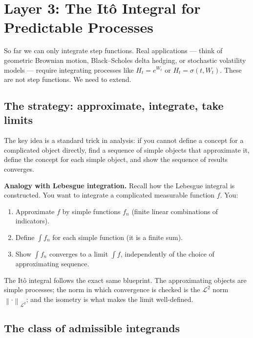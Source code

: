 \documentclass[11pt,a4paper]{article}
\theoremstyle{definition}
\theoremstyle{plain}
\theoremstyle{remark}
\newcommand{\calL}{\mathcal{L}}
\newcommand{\norm}[1]{\left\|#1\right\|}
\begin{document}
\section{Layer 3: The It\^{o} Integral for Predictable Processes}
\label{sec:predictable}

So far we can only integrate step functions. Real applications — think of geometric Brownian motion, Black--Scholes delta hedging, or stochastic volatility models — require integrating processes like $H_t = e^{W_t}$ or $H_t = \sigma(t, W_t)$. These are not step functions. We need to extend.

\subsection{The strategy: approximate, integrate, take limits}

The key idea is a standard trick in analysis: if you cannot define a concept for a complicated object directly, find a sequence of simple objects that approximate it, define the concept for each simple object, and show the sequence of results converges.

\begin{tutobox}
\textbf{Analogy with Lebesgue integration.}
Recall how the Lebesgue integral is constructed. You want to integrate a complicated measurable function $f$. You:
\begin{enumerate}
  \item Approximate $f$ by simple functions $f_n$ (finite linear combinations of indicators).
  \item Define $\int f_n$ for each simple function (it is a finite sum).
  \item Show $\int f_n$ converges to a limit $\int f$, independently of the choice of approximating sequence.
\end{enumerate}
The Itô integral follows the exact same blueprint. The approximating objects are simple processes; the norm in which convergence is checked is the $\calL^2$ norm $\norm{\cdot}_{\calL^2}$; and the isometry is what makes the limit well-defined.
\end{tutobox}

\subsection{The class of admissible integrands}
\end{document}
